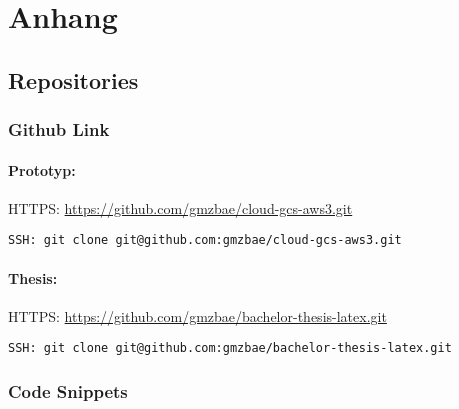 
\chapter{Anhang}

\section{Repositories}
\subsection{Github Link}

\subsubsection*{Prototyp:}

HTTPS: \url{https://github.com/gmzbae/cloud-gcs-aws3.git}

\begin{verbatim}SSH: git clone git@github.com:gmzbae/cloud-gcs-aws3.git\end{verbatim}			

\subsubsection*{Thesis:}

HTTPS: \url{https://github.com/gmzbae/bachelor-thesis-latex.git}

\begin{verbatim}SSH: git clone git@github.com:gmzbae/bachelor-thesis-latex.git \end{verbatim}

\subsection{Code Snippets}


\clearpage